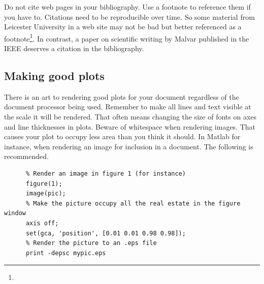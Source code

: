 \documentclass[11pt, a4paper]{article}
\begin{document}
Do not cite web pages in your bibliography. Use a footnote to reference them if you have to. Citations need to be reproducible over time. So some material from Leicester University in a web site may not be bad but better referenced as a footnote\footnote{}. In contrast, a paper on scientific writing by Malvar \cite{malvar_2008} published in the IEEE deserves a citation in the bibliography.


 
 \subsection{Making good plots}
 There is an art to rendering good plots for your document regardless of the document processor being used. Remember to make all lines and text visible at the scale it will be rendered. That often means changing the size of fonts on axes and line thicknesses in plots. Beware of whitespace when rendering images. That causes your plot to occupy less area than you think it should. In Matlab for instance, when rendering an image for inclusion in a document. The following is recommended.
\begin{center}
 \begin{minipage}{\textwidth}
    \begin{verbatim}
      % Render an image in figure 1 (for instance)
      figure(1); 
      image(pic); 
      % Make the picture occupy all the real estate in the figure window
      axis off; 
      set(gca, 'position', [0.01 0.01 0.98 0.98]);
      % Render the picture to an .eps file
      print -depsc mypic.eps  
    \end{verbatim}
 \end{minipage}
\end{center}
\end{document}
